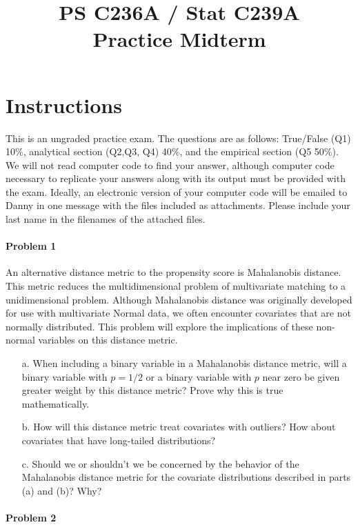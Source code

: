 \documentclass{article}
\title{PS C236A / Stat C239A \\  Practice Midterm \\ }%
\date{}
\begin{document}
\maketitle
\vspace{-4em}
\section*{Instructions}

This is an ungraded practice exam.  The questions are as follows:
True/False (Q1) 10\%, analytical section (Q2,Q3, Q4) 40\%, and the
empirical section (Q5 50\%). We will not read computer code to find
your answer, although computer code necessary to replicate your
answers along with its output must be provided with the exam. Ideally,
an electronic version of your computer code will be emailed to Danny
in one message with the files included as attachments. Please include
your last name in the filenames of the attached files.


\paragraph{Problem 1}
 An alternative distance metric to the propensity score is
Mahalanobis distance. This metric reduces the multidimensional problem
of multivariate matching to a unidimensional problem. Although
Mahalanobis distance was originally developed for use with
multivariate Normal data, we often encounter covariates that are not
normally distributed. This problem will explore the implications of
these non-normal variables on this distance metric.
\vspace{1em}
\noindent 
   \begin{itemize}
     \item[a.]  When including a binary variable in a Mahalanobis distance metric,
will a binary variable with $p=1/2$ or a binary variable with $p$ near
zero be given greater weight by this distance metric? Prove why this
is true mathematically.
     \item[b.]
     How will this distance metric treat covariates with outliers? How
about covariates that have long-tailed distributions?
     \item[c.] Should we or shouldn’t we be concerned by the behavior of the
Mahalanobis distance metric for the covariate distributions described
in parts (a) and (b)? Why?
   \end{itemize}   



\paragraph{Problem 2}
\end{document}
